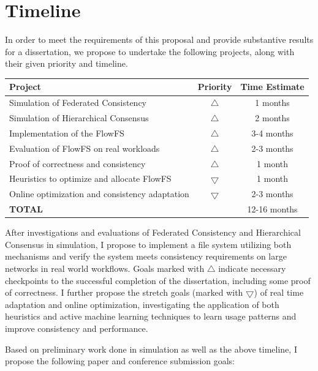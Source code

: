 \documentclass{article}
\begin{document}
\section{Timeline}

In order to meet the requirements of this proposal and provide substantive results for a dissertation, we propose to undertake the following projects, along with their given priority and timeline.

\begin{center}
\begin{tabular}{|l c|c|}
\hline
Project & Priority & Time Estimate \\
\hline
Simulation of Federated Consistency & $\bigtriangleup$ & 1 months \\
Simulation of Hierarchical Consensus & $\bigtriangleup$ & 2 months \\
Implementation of the FlowFS & $\bigtriangleup$ & 3-4 months \\
Evaluation of FlowFS on real workloads & $\bigtriangleup$ & 2-3 months \\
Proof of correctness and consistency & $\bigtriangleup$ & 1 month \\
Heuristics to optimize and allocate FlowFS & $\bigtriangledown$ & 1 month \\
Online optimization and consistency adaptation & $\bigtriangledown$ & 2-3 months \\
\hline
\multicolumn{2}{|l|}{\textbf{TOTAL}} & 12-16 months \\
\hline
\end{tabular}
\end{center}

After investigations and evaluations of Federated Consistency and Hierarchical Consensus in simulation, I propose to implement a file system utilizing both mechanisms and verify the system meets consistency requirements on large networks in real world workflows. Goals marked with $\bigtriangleup$ indicate necessary checkpoints to the successful completion of the dissertation, including some proof of correctness. I further propose the stretch goals (marked with $\bigtriangledown$) of real time adaptation and online optimization, investigating the application of both heuristics and active machine learning techniques to learn usage patterns and improve consistency and performance.

Based on preliminary work done in simulation as well as the above timeline, I propose the following paper and conference submission goals:
\end{document}
